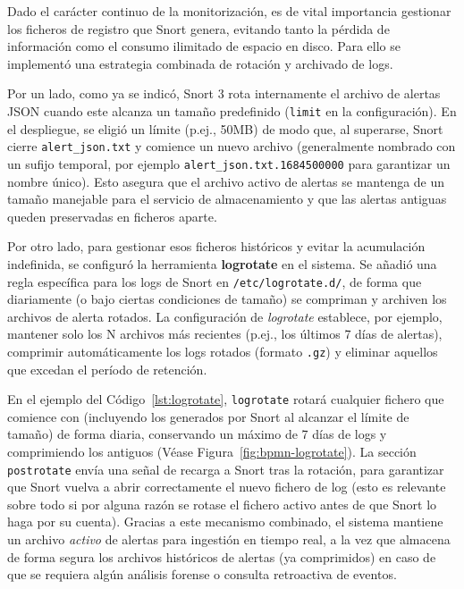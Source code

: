 \documentclass[11pt,a4paper,twoside]{report}
\begin{document}
Dado el carácter continuo de la monitorización, es de vital importancia gestionar los ficheros de registro que Snort genera, evitando tanto la pérdida de información como el consumo ilimitado de espacio en disco. Para ello se implementó una estrategia combinada de rotación y archivado de logs.\newline

Por un lado, como ya se indicó, Snort 3 rota internamente el archivo de alertas JSON cuando este alcanza un tamaño predefinido (\texttt{limit} en la configuración). En el despliegue, se eligió un límite (p.ej., 50MB) de modo que, al superarse, Snort cierre \texttt{alert\_json.txt} y comience un nuevo archivo (generalmente nombrado con un sufijo temporal, por ejemplo \texttt{alert\_json.txt.1684500000} para garantizar un nombre único). Esto asegura que el archivo activo de alertas se mantenga de un tamaño manejable para el servicio de almacenamiento y que las alertas antiguas queden preservadas en ficheros aparte.\newline

Por otro lado, para gestionar esos ficheros históricos y evitar la acumulación indefinida, se configuró la herramienta \textbf{logrotate} en el sistema. Se añadió una regla específica para los logs de Snort en \texttt{/etc/logrotate.d/}, de forma que diariamente (o bajo ciertas condiciones de tamaño) se compriman y archiven los archivos de alerta rotados. La configuración de \textit{logrotate} establece, por ejemplo, mantener solo los N archivos más recientes (p.ej., los últimos 7 días de alertas), comprimir automáticamente los logs rotados (formato \texttt{.gz}) y eliminar aquellos que excedan el período de retención.\newline

En el ejemplo del Código~\ref{lst:logrotate}, \texttt{logrotate} rotará cualquier fichero que comience con  (incluyendo los generados por Snort al alcanzar el límite de tamaño) de forma diaria, conservando un máximo de 7 días de logs y comprimiendo los antiguos (Véase Figura~\ref{fig:bpmn-logrotate}). La sección \texttt{postrotate} envía una señal de recarga a Snort tras la rotación, para garantizar que Snort vuelva a abrir correctamente el nuevo fichero de log (esto es relevante sobre todo si por alguna razón se rotase el fichero activo antes de que Snort lo haga por su cuenta). Gracias a este mecanismo combinado, el sistema mantiene un archivo \textit{activo} de alertas para ingestión en tiempo real, a la vez que almacena de forma segura los archivos históricos de alertas (ya comprimidos) en caso de que se requiera algún análisis forense o consulta retroactiva de eventos.
\end{document}
